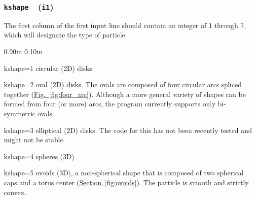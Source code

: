 \documentclass[letterpaper,11pt]{article}
\newcommand{\Var}[2]{\texttt{#1}\ \  (\texttt{#2})}
\newlength{\Labelwidth}
\newcommand{\Entrylabel}[1]{\makebox[\Labelwidth][r]{\texttt{#1}}}
\newenvironment{Options}
{\begin{list}{}{%
\renewcommand{\makelabel}{\Entrylabel}%
\setlength{\leftmargin} {0.90in}%
\setlength{\rightmargin}{0.00in}%
\setlength{\labelsep}   {0.10in}%
\setlength{\labelwidth} {\Labelwidth}%
}}
{\end{list}}
\begin{document}
\subsubsection[\texttt{kshape}]{\Var{kshape}{i1}}\label{sec:kshape}
The first column of the first input line should contain
an integer of 1 through 7, which will designate the type of particle.
\begin{Options}
\item[kshape=1]
circular (2D) disks
\item[kshape=2]
oval (2D) disks.  The ovals are composed of four circular arcs spliced 
together (\hyperref[fig:four_arc]{Fig.~\ref*{fig:four_arc}}).
Although a more general variety of shapes can be formed from
four (or more) arcs, the program currently supports only bi-symmetric
ovals.
\item[kshape=3]
elliptical (2D) disks.  The code for this has not been recently tested
and might not be stable.
\item[kshape=4]
spheres (3D)
\item[kshape=5]
ovoids (3D), a non-spherical shape that is composed
of two spherical caps and a torus center
(\hyperref[fig:ovoids]{Section~\ref*{fig:ovoids}}).
The particle is smooth and strictly convex.
\begin{figure}
\centering
{}\quad%
%

\end{figure}
\end{Options}
\end{document}

